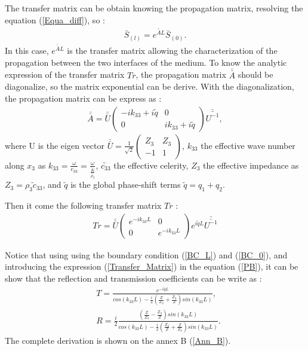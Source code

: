 \documentclass{article}
\begin{document}
    The transfer matrix can be obtain knowing the propagation matrix, resolving the equation (\ref{Equa_diff}), so :
    \begin{align}
    \bar{S}_{(l)}=e^{\bar{\bar{A}}L}\bar{S}_{(0)}.\label{PB}
    \end{align}
    In this case, $e^{\bar{\bar{A}}L}$ is the transfer matrix allowing the characterization of the propagation between the two interfaces of the medium.
    To know the analytic expression of the transfer matrix $Tr$, the propagation matrix $\bar{\bar{A}}$ should be diagonalize, so the matrix exponential can be derive.
    With the diagonalization, the propagation matrix can be express as :
     \begin{align}
    \bar{\bar{A}}=\bar{\bar{U}} \begin{pmatrix}
    								-ik_{33}+i\tilde{q} & 0 \\ 0 & ik_{33}+i\tilde{q} 
    							\end{pmatrix} \bar{\bar{U^{-1}}},
    \end{align}
    where U is the eigen vector $\bar{\bar{U}}=\frac{1}{\sqrt{2}}\begin{pmatrix} Z_3 & Z_3 \\ -1 & 1 \end{pmatrix}$, $k_{33}$ the effective wave number along $x_3$ as $k_{33}=\frac{\omega}{c_{33}}=\frac{\omega}{\frac{\tilde{K}}{\tilde{\rho_3}}}$, $\tilde{c_{33}}$ the effective celerity, $Z_3$ the effective impedance as $Z_3=\tilde{\rho_3c_{33}}$, and $\tilde{q}$ is the global phase-shift terms $\tilde{q}=q_1+q_2$.
    
    Then it come the following transfer matrix $Tr$ :
        \begin{align}
    Tr=\bar{\bar{U}}\begin{pmatrix}
    e^{-ik_{33}L} & 0 \\ 0 & e^{-ik_{33}L} 
    \end{pmatrix} e^{i\tilde{q}L}\bar{\bar{U^{-1}}}\label{Transfer_Matrix}
    \end{align}
    
    Notice that using using the boundary condition (\ref{BC_L}) and (\ref{BC_0}), and introducing the expression (\ref{Transfer_Matrix}) in the equation  (\ref{PB}), it can be show that the reflection and transmission coefficients can be write as :
        \begin{align}
    &T=\frac{e^{-i\tilde{q}L}}{cos(k_{33}L)-\frac{i}{2}(\frac{Z}{Z_3}+\frac{Z_3}{Z})sin(k_{33}L)}\label{Transmission},\\ 
    &R=\frac{i}{2} \frac{(\frac{Z}{Z_3}-\frac{Z_3}{Z})sin(k_{33}L)}{cos(k_{33}L)-\frac{i}{2}(\frac{Z_3}{Z}+\frac{Z}{Z_3})sin(k_{33}L)}\label{Reflexion}.
      \end{align}
      The complete derivation is shown on the annex B (\ref{Ann_B}).
\end{document}
